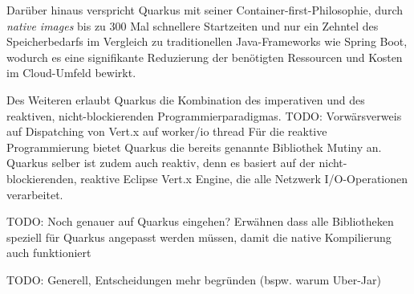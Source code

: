 Darüber hinaus verspricht Quarkus mit seiner Container-first-Philosophie, durch \textit{native images} bis zu 300 Mal schnellere Startzeiten
und nur ein Zehntel des
Speicherbedarfs im Vergleich zu traditionellen Java-Frameworks wie Spring Boot, wodurch es eine signifikante Reduzierung der benötigten Ressourcen und Kosten
im Cloud-Umfeld bewirkt. \parencite{RedHatQuarkusInfografik}

Des Weiteren erlaubt Quarkus die Kombination des imperativen und des reaktiven, nicht-blockierenden Programmierparadigmas.
TODO: Vorwärsverweis auf Dispatching von Vert.x auf worker/io thread
Für die reaktive Programmierung bietet Quarkus die bereits genannte Bibliothek Mutiny an.
Quarkus selber ist zudem auch reaktiv, denn es basiert auf der nicht-blockierenden, reaktive Eclipse Vert.x Engine, die
alle Netzwerk I/O-Operationen verarbeitet. \parencite{QuarkusReactiveGettingStarted, Quarkus}

TODO: Noch genauer auf Quarkus eingehen? Erwähnen dass alle Bibliotheken speziell für Quarkus angepasst werden müssen, damit
die native Kompilierung auch funktioniert

TODO: Generell, Entscheidungen mehr begründen (bspw. warum Uber-Jar)